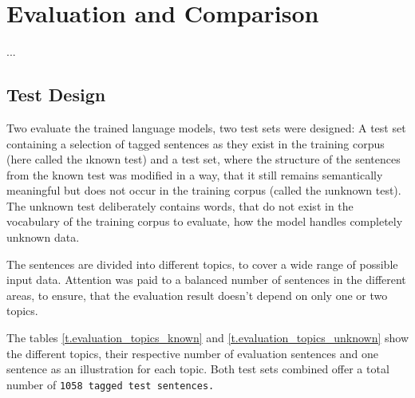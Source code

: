 \chapter{Evaluation and Comparison}\label{c.evaluation}
...

\section{Test Design}\label{c.evaluation.test}
Two evaluate the trained language models, two test sets were designed: A test set containing a selection of tagged sentences as they exist in the training corpus (here called the \i{known test}) and a test set, where the structure of the sentences from the known test was modified in a way, that it still remains semantically meaningful but does not occur in the training corpus (called the \i{unknown test}). The unknown test deliberately contains words, that do not exist in the vocabulary of the training corpus to evaluate, how the model handles completely unknown data.

The sentences are divided into different topics, to cover a wide range of possible input data. Attention was paid to a balanced number of sentences in the different areas, to ensure, that the evaluation result doesn't depend on only one or two topics.

The tables \ref{t.evaluation_topics_known} and \ref{t.evaluation_topics_unknown} show the different topics, their respective number of evaluation sentences and one sentence as an illustration for each topic. Both test sets combined offer a total number of \tt{1058} tagged test sentences.

